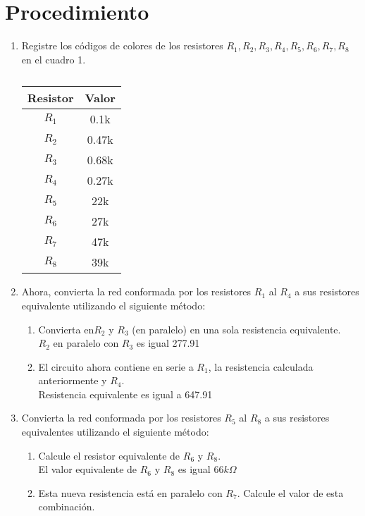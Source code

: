 \section{Procedimiento}
\begin{enumerate}
	\item Registre los códigos de colores de los resistores $R_{1}, R_{2}, R_{3}, R_{4}, R_{5}, R_{6}, R_{7}, R_{8}$ en el cuadro 1.
	\begin{table}[h]
		\centering
		\begin{tabular}{|c|c|}
			\hline
			Resistor & Valor\\ \hline
			$R_{1}$&0.1k\\ \hline
			$R_{2}$&0.47k\\ \hline
			$R_{3}$&0.68k\\ \hline
			$R_{4}$&0.27k\\ \hline
			$R_{5}$&22k\\ \hline
			$R_{6}$&27k\\ \hline
			$R_{7}$&47k\\ \hline
			$R_{8}$&39k\\ \hline
		\end{tabular}
		\caption{}
	\end{table}
	\item Ahora, convierta la red conformada por los resistores $R_{1}$ al $R_{4}$  a sus resistores equivalente utilizando el siguiente método:
	\begin{enumerate}
		\item Convierta en$R_{2}$ y $R_{3}$ (en paralelo) en una sola resistencia equivalente.
		\\ $R_{2}$  en paralelo con $R_{3}$ es igual 277.91 
		\item El circuito ahora contiene en serie a $R_{1}$, la resistencia calculada anteriormente  y  $R_{4}$.
		\\ Resistencia equivalente es igual a 647.91
	\end{enumerate}
	\item Convierta la red conformada por los resistores $R_{5} $ al $R_{8}$ a sus resistores equivalentes utilizando el siguiente método:
	\begin{enumerate}
		\item Calcule el resistor equivalente de $R_{6}$ y $R_{8}$.
		\\ El valor equivalente de $R_{6}$ y $R_{8}$ es igual 66$k\Omega$
		\item Esta nueva resistencia está en paralelo con $R_{7}$. Calcule el valor de esta combinación.

\end{enumerate}
\end{enumerate}
